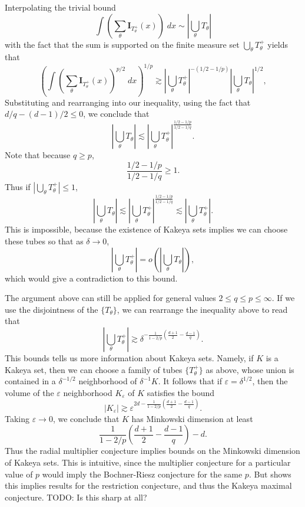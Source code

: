 %
Interpolating the trivial bound
%
\[ \int \left( \sum_\theta \mathbf{I}_{T_\theta^+}(x) \right)\; dx \sim \left| \bigcup_\theta T_\theta \right| \]
%
with the fact that the sum is supported on the finite measure set $\bigcup_\theta T_\theta^+$ yields that
%
\[ \left( \int \left( \sum_\theta \mathbf{I}_{T_\theta^+}(x) \right)^{p/2}\; dx \right)^{1/p} \gtrsim \left| \bigcup_\theta T_\theta^+ \right|^{-(1/2 - 1/p)} \left| \bigcup_\theta T_\theta \right|^{1/2}, \]
%
Substituting and rearranging into our inequality, using the fact that $d/q - (d-1)/2 \leq 0$, we conclude that
\[ \left| \bigcup_\theta T_\theta \right| \lesssim \left| \bigcup_\theta T_\theta^+ \right|^{\frac{1/2 - 1/p}{1/2 - 1/q}}. \]
%
Note that because $q \geq p$,
%
\[ \frac{1/2 - 1/p}{1/2 - 1/q} \geq 1. \]
%
Thus if $|\bigcup_\theta T_\theta^+| \leq 1$,
%
\[ \left| \bigcup_\theta T_\theta \right| \lesssim \left| \bigcup_\theta T_\theta^+ \right|^{\frac{1/2 - 1/p}{1/2 - 1/q}} \lesssim \left| \bigcup_\theta T_\theta^+ \right|. \]
%
This is impossible, because the existence of Kakeya sets implies we can choose these tubes so that as $\delta \to 0$,
%
\[ \left| \bigcup_\theta T_\theta^+ \right| = o \left( \left| \bigcup_\theta T_\theta \right| \right), \]
%
which would give a contradiction to this bound.

\begin{remark}
    The argument above can still be applied for general values $2 \leq q \leq p \leq \infty$. If we use the disjointness of the $\{ T_\theta \}$, we can rearrange the inequality above to read that
    \[ \left| \bigcup_\theta T_\theta^+ \right| \gtrsim \delta^{- \frac{1}{1 - 2/p} \left( \frac{d+1}{2} - \frac{d-1}{q} \right)}. \]
    This bounds tells us more information about Kakeya sets. Namely, if $K$ is a Kakeya set, then we can choose a family of tubes $\{ T_\theta^+ \}$ as above, whose union is contained in a $\delta^{-1/2}$ neighborhood of $\delta^{-1} K$. It follows that if $\varepsilon = \delta^{1/2}$, then the volume of the $\varepsilon$ neighborhood $K_\varepsilon$ of $K$ satisfies the bound
    \[ |K_\varepsilon| \gtrsim \varepsilon^{2d - \frac{1}{1 - 2/p} \left( \frac{d+1}{2} - \frac{d-1}{q} \right)}. \]
    Taking $\varepsilon \to 0$, we conclude that $K$ has Minkowski dimension at least
    \[ \frac{1}{1 - 2/p} \left( \frac{d+1}{2} - \frac{d-1}{q} \right) - d. \]
    Thus the radial multiplier conjecture implies bounds on the Minkowski dimension of Kakeya sets. This is intuitive, since the multiplier conjecture for a particular value of $p$ would imply the Bochner-Riesz conjecture for the same $p$. But \cite{Tao} shows this implies results for the restriction conjecture, and thus the Kakeya maximal conjecture. TODO: Is this sharp at all?
\end{remark}

